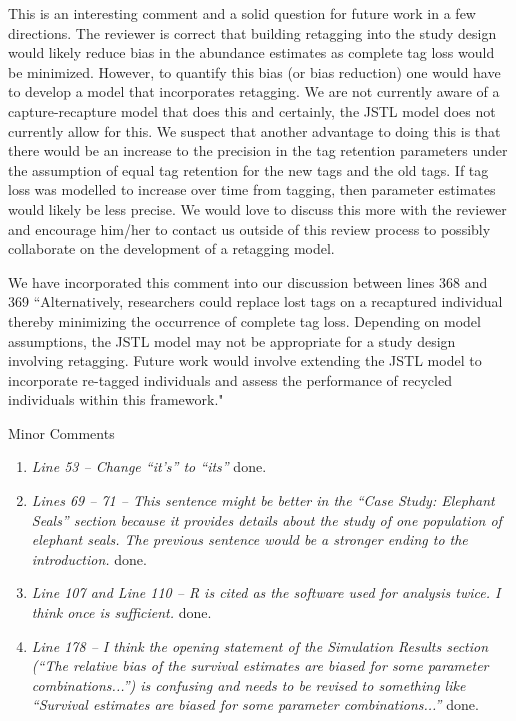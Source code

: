 \documentclass[12pt]{article}
\begin{document}
\begin{enumerate}
This is an interesting comment and a solid question for future work in a few directions.  The reviewer is correct that building retagging into the study design would likely reduce bias in the abundance estimates as complete tag loss would be minimized.  However, to quantify this bias (or bias reduction) one would have to develop a model that incorporates retagging. We are not currently aware of a capture-recapture model that does this and certainly, the JSTL model does not currently allow for this.  We suspect that another advantage to doing this is that there would be an increase to the precision in the tag retention parameters under the assumption of equal tag retention for the new tags and the old tags.  If tag loss was modelled to increase over time from tagging, then parameter estimates would likely be less precise. We would love to discuss this more with the reviewer and encourage him/her to contact us outside of this review process to possibly collaborate on the development of a retagging model.

We have incorporated this comment into our discussion between lines 368 and 369
``Alternatively, researchers could replace lost tags on a recaptured individual thereby minimizing the occurrence of complete tag loss.  Depending on model assumptions, the JSTL model may not be appropriate for a study design involving retagging.  Future work would involve extending the JSTL model to  incorporate re-tagged individuals and assess the performance of recycled individuals within this framework."

\noindent Minor Comments
\begin{enumerate}
\item {\it Line 53 – Change “it’s” to “its”} 
done.

\item {\it Lines 69 – 71 – This sentence might be better in the “Case Study: Elephant Seals” section because it provides details about the study of one population of elephant seals. The previous sentence would be a stronger ending to the introduction.} 
done.

\item {\it Line 107 and Line 110 – R is cited as the software used for analysis twice. I think once is sufficient.} 
done.

\item {\it Line 178 – I think the opening statement of the Simulation Results section (“The relative bias of the survival estimates are biased for some parameter combinations...”) is confusing and needs to be revised to something like “Survival estimates are biased for some parameter combinations...”} 
done.


\end{enumerate}
\end{enumerate}
\end{document}
